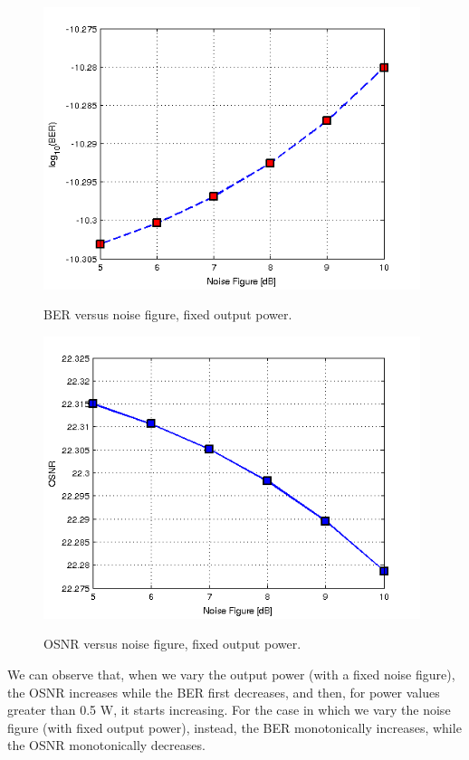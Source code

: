 \documentclass[a4paper,10pt]{report}
\begin{document}
\begin{figure}[!ht]
   \centering
   \includegraphics[width=11cm]{q1c2.png}\\
   \caption{BER versus noise figure, fixed output power.}
   \label{q1c2}
\end{figure}

\newpage
\begin{figure}[!ht]
   \centering
   \includegraphics[width=11cm]{q1c3.png}\\
   \caption{OSNR versus noise figure, fixed output power.}
   \label{q1c3}
\end{figure}

We can observe that, when we vary the output power (with a fixed noise figure), the OSNR increases while the BER first decreases, and
then, for power values greater than 0.5 W, it starts increasing.
For the case in which we vary the noise figure (with fixed output power), instead, the BER monotonically increases, while the OSNR
monotonically decreases.
\end{document}
